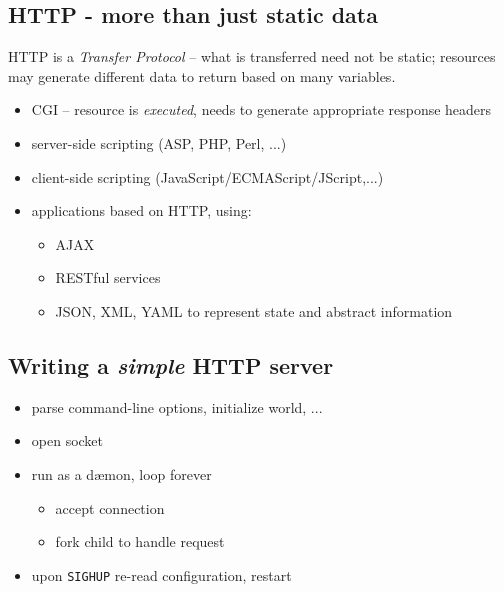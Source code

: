 \documentclass[xga]{xdvislides}
\begin{document}
\subsection{HTTP - more than just static data}
HTTP is a {\em Transfer Protocol} -- what is transferred need not be
static; resources may generate different data to return based on many
variables.

\begin{itemize}
	\item CGI -- resource is {\em executed}, needs to generate
		appropriate response headers
	\item server-side scripting (ASP, PHP, Perl, ...)
	\item client-side scripting (JavaScript/ECMAScript/JScript,...)
	\item applications based on HTTP, using:
		\begin{itemize}
			\item AJAX
			\item RESTful services
			\item JSON, XML, YAML to represent state and
				abstract information
		\end{itemize}
\end{itemize}

\subsection{Writing a {\em simple} HTTP server}
\begin{itemize}
	\item parse command-line options, initialize world, ...
	\item open socket
	\item run as a d\ae mon, loop forever
		\begin{itemize}
			\item accept connection
			\item fork child to handle request
		\end{itemize}
	\item upon {\tt SIGHUP} re-read configuration, restart
\end{itemize}
\end{document}
